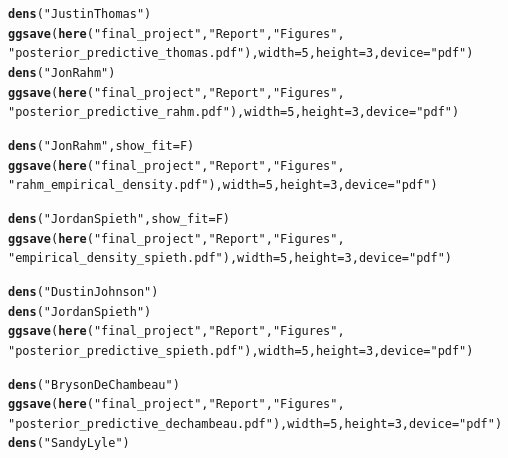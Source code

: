 \documentclass{article}\usepackage[]{graphicx}\usepackage[]{color}
\makeatletter
\newcommand{\hlnum}[1]{\textcolor[rgb]{0.686,0.059,0.569}{#1}}%
\newcommand{\hlstr}[1]{\textcolor[rgb]{0.192,0.494,0.8}{#1}}%
\newcommand{\hlstd}[1]{\textcolor[rgb]{0.345,0.345,0.345}{#1}}%
\newcommand{\hlkwc}[1]{\textcolor[rgb]{0.333,0.667,0.333}{#1}}%
\newcommand{\hlkwd}[1]{\textcolor[rgb]{0.737,0.353,0.396}{\textbf{#1}}}%
\newenvironment{kframe}{%
 \def\at@end@of@kframe{}%
 \ifinner\ifhmode%
  \def\at@end@of@kframe{\end{minipage}}%
  \begin{minipage}{\columnwidth}%
 \fi\fi%
 \def\FrameCommand##1{\hskip\@totalleftmargin \hskip-\fboxsep
 \colorbox{shadecolor}{##1}\hskip-\fboxsep
     \hskip-\linewidth \hskip-\@totalleftmargin \hskip\columnwidth}%
 \MakeFramed {\advance\hsize-\width
   \@totalleftmargin\z@ \linewidth\hsize
   \@setminipage}}%
 {\par\unskip\endMakeFramed%
 \at@end@of@kframe}
\newenvironment{knitrout}{}{} %
\makeatother
\begin{document}
\begin{knitrout}
\begin{kframe}
\begin{alltt}
\hlkwd{dens}\hlstd{(}\hlstr{"Justin Thomas"}\hlstd{)}
\hlkwd{ggsave}\hlstd{(}\hlkwd{here}\hlstd{(}\hlstr{"final_project"}\hlstd{,} \hlstr{"Report"}\hlstd{,} \hlstr{"Figures"}\hlstd{,}
            \hlstr{"posterior_predictive_thomas.pdf"}\hlstd{),} \hlkwc{width}\hlstd{=}\hlnum{5}\hlstd{,}\hlkwc{height}\hlstd{=}\hlnum{3}\hlstd{,} \hlkwc{device}\hlstd{=}\hlstr{"pdf"}\hlstd{)}
\hlkwd{dens}\hlstd{(}\hlstr{"Jon Rahm"}\hlstd{)}
\hlkwd{ggsave}\hlstd{(}\hlkwd{here}\hlstd{(}\hlstr{"final_project"}\hlstd{,} \hlstr{"Report"}\hlstd{,} \hlstr{"Figures"}\hlstd{,}
            \hlstr{"posterior_predictive_rahm.pdf"}\hlstd{),} \hlkwc{width}\hlstd{=}\hlnum{5}\hlstd{,}\hlkwc{height}\hlstd{=}\hlnum{3}\hlstd{,} \hlkwc{device}\hlstd{=}\hlstr{"pdf"}\hlstd{)}

\hlkwd{dens}\hlstd{(}\hlstr{"Jon Rahm"}\hlstd{,} \hlkwc{show_fit} \hlstd{= F)}
\hlkwd{ggsave}\hlstd{(}\hlkwd{here}\hlstd{(}\hlstr{"final_project"}\hlstd{,} \hlstr{"Report"}\hlstd{,} \hlstr{"Figures"}\hlstd{,}
            \hlstr{"rahm_empirical_density.pdf"}\hlstd{),} \hlkwc{width}\hlstd{=}\hlnum{5}\hlstd{,} \hlkwc{height}\hlstd{=}\hlnum{3}\hlstd{,} \hlkwc{device}\hlstd{=}\hlstr{"pdf"}\hlstd{)}

\hlkwd{dens}\hlstd{(}\hlstr{"Jordan Spieth"}\hlstd{,} \hlkwc{show_fit} \hlstd{= F)}
\hlkwd{ggsave}\hlstd{(}\hlkwd{here}\hlstd{(}\hlstr{"final_project"}\hlstd{,} \hlstr{"Report"}\hlstd{,} \hlstr{"Figures"}\hlstd{,}
            \hlstr{"empirical_density_spieth.pdf"}\hlstd{),} \hlkwc{width}\hlstd{=}\hlnum{5}\hlstd{,} \hlkwc{height}\hlstd{=}\hlnum{3}\hlstd{,} \hlkwc{device}\hlstd{=}\hlstr{"pdf"}\hlstd{)}

\hlkwd{dens}\hlstd{(}\hlstr{"Dustin Johnson"}\hlstd{)}
\hlkwd{dens}\hlstd{(}\hlstr{"Jordan Spieth"}\hlstd{)}
\hlkwd{ggsave}\hlstd{(}\hlkwd{here}\hlstd{(}\hlstr{"final_project"}\hlstd{,} \hlstr{"Report"}\hlstd{,} \hlstr{"Figures"}\hlstd{,}
            \hlstr{"posterior_predictive_spieth.pdf"}\hlstd{),} \hlkwc{width}\hlstd{=}\hlnum{5}\hlstd{,} \hlkwc{height}\hlstd{=}\hlnum{3}\hlstd{,} \hlkwc{device}\hlstd{=}\hlstr{"pdf"}\hlstd{)}

\hlkwd{dens}\hlstd{(}\hlstr{"Bryson DeChambeau"}\hlstd{)}
\hlkwd{ggsave}\hlstd{(}\hlkwd{here}\hlstd{(}\hlstr{"final_project"}\hlstd{,} \hlstr{"Report"}\hlstd{,} \hlstr{"Figures"}\hlstd{,}
            \hlstr{"posterior_predictive_dechambeau.pdf"}\hlstd{),} \hlkwc{width}\hlstd{=}\hlnum{5}\hlstd{,}\hlkwc{height}\hlstd{=}\hlnum{3}\hlstd{,} \hlkwc{device}\hlstd{=}\hlstr{"pdf"}\hlstd{)}
\hlkwd{dens}\hlstd{(}\hlstr{"Sandy Lyle"}\hlstd{)}


\end{alltt}
\end{kframe}
\end{knitrout}
\end{document}
